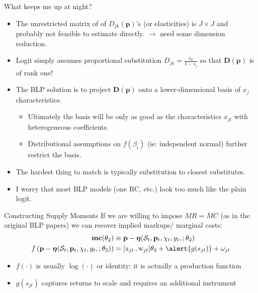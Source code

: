 \begin{frame}{What keeps me up at night?}
\begin{itemize}
\item The unrestricted matrix of of $D_{jk}(\mathbf{p})$'s (or elasticities) is $J \times J$ and probably not feasible to estimate directly. $\rightarrow$ need some \alert{dimension reduction}.
\item Logit simply assumes proportional substitution ${D}_{jk}=\frac{s_k}{1-s_{j}}$ so that $\mathbf{D}(\mathbf{p})$ is of rank one!
\item The BLP solution is to project $\mathbf{D}(\mathbf{p})$ onto a lower-dimensional basis of $x_{j}$ characteristics.
\begin{itemize}
\item Ultimately the basis will be only as good as the characteristics $x_{jt}$ with heterogeneous coefficients.
\item Distributional assumptions on $f(\beta_i)$ (ie: independent normal) further restrict the basis.
\end{itemize}
\item The hardest thing to match is typically \alert{substitution to closest substitutes}.
\item I worry that most BLP models (one RC, etc.) look too much like the plain logit.
\end{itemize}
\end{frame}





\begin{frame}{Constructing Supply Moments}
If we are willing to impose $MR = MC$ (as in the original BLP papers) we can recover implied markups/ marginal costs:
\begin{align*}
\mathbf{mc}(\theta_2)&\equiv \mathbf{p}- \boldsymbol{\eta}(\mathcal{S}_t,\mathbf{p}_t,\chi_t, y_t, ;\theta_2) \\
f\left(\mathbf{p}- \boldsymbol{\eta}(\mathcal{S}_t,\mathbf{p}_t,\chi_t, y_t, ;\theta_2)  \right) &= [\textrm{x}_{jt} \,, \textrm{w}_{jt}] \theta_3 + \alert{g(s_{jt})} +  \omega_{jt}
\end{align*}
\begin{itemize}
\item $f(\cdot)$ is usually $\log(\cdot)$ or identity; it is actually a \alert{production function}
\item $g(s_{jt})$ captures \alert{returns to scale} and requires an additional \alert{instrument}
\end{itemize}
\end{frame}

